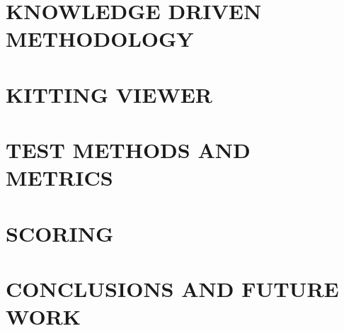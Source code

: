 \documentclass[letterpaper, 10 pt, conference]{ieeeconf}  %
\begin{document}
\section{KNOWLEDGE DRIVEN METHODOLOGY}
\label{sect:knowledge_driven_methodology}


\section{KITTING VIEWER}
\label{sect:KittingViewer}


\section{TEST METHODS AND METRICS}
\label{sect:Metrics}


\section{SCORING} 
\label{sect:Scoring}





\section{CONCLUSIONS AND FUTURE WORK}
\label{sect:Conclusions}





\end{document}
